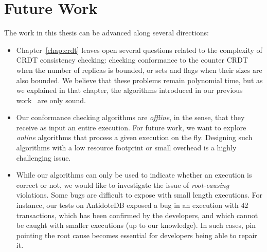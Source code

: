 \section{Future Work}
\label{sec:global-future-work}

The work in this thesis can be advanced along several directions:
\begin{itemize}
\item Chapter~\ref{chap:crdt} leaves open several questions related to the complexity of CRDT consistency checking: checking conformance to the counter CRDT when the number of replicas is bounded, or sets and flags when their sizes are also bounded. We believe that these problems remain polynomial time, but as we explained in that chapter, the algorithms introduced in our previous work~\cite{DBLP:conf/cav/BiswasEE19} are only sound.


\item Our conformance checking algorithms are \emph{offline}, in the sense, that they receive as input an entire execution. For future work, we want to explore \emph{online} algorithms that process a given execution on the fly. Designing such algorithms with a low resource footprint or small overhead is a highly challenging issue.

%

\item While our algorithms can only be used to indicate whether an execution is correct or not, we would like to investigate the issue of \emph{root-causing} violations. Some bugs are difficult to expose with small length executions. For instance, our tests on AntidoteDB exposed a bug in an execution with 42 transactions, which has been confirmed by the developers, and which cannot be caught with smaller executions (up to our knowledge). In such cases, pin pointing the root cause becomes essential for developers being able to repair it.


\end{itemize}
